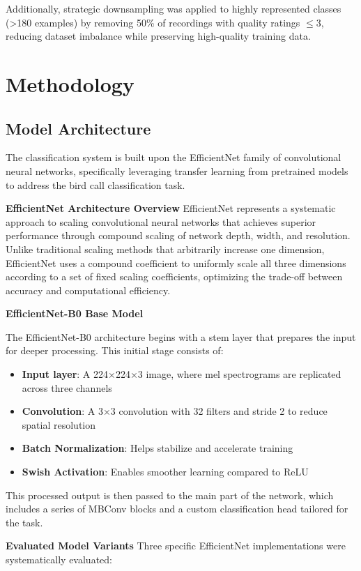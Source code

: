 \documentclass[ERTS, 2025]{ERTS}
\begin{document}
Additionally, strategic downsampling was applied to highly represented classes (>180 examples) by removing 50\% of recordings with quality ratings $\leq$3, reducing dataset imbalance while preserving high-quality training data.

\section{Methodology}
\subsection{Model Architecture}
The classification system is built upon the EfficientNet family of convolutional neural networks, specifically leveraging transfer learning from pretrained models to address the bird call classification task.

\textbf{EfficientNet Architecture Overview}
EfficientNet represents a systematic approach to scaling convolutional neural networks that achieves superior performance through compound scaling of network depth, width, and resolution. Unlike traditional scaling methods that arbitrarily increase one dimension, EfficientNet uses a compound coefficient to uniformly scale all three dimensions according to a set of fixed scaling coefficients, optimizing the trade-off between accuracy and computational efficiency.

\textbf{EfficientNet-B0 Base Model}

The EfficientNet-B0 architecture begins with a stem layer that prepares the input for deeper processing. This initial stage consists of:
\begin{itemize}
    \item \textbf{Input layer}: A 224×224×3 image, where mel spectrograms are replicated across three channels
    \item \textbf{Convolution}: A 3×3 convolution with 32 filters and stride 2 to reduce spatial resolution
    \item \textbf{Batch Normalization}: Helps stabilize and accelerate training
    \item \textbf{Swish Activation}: Enables smoother learning compared to ReLU
\end{itemize}

This processed output is then passed to the main part of the network, which includes a series of MBConv blocks and a custom classification head tailored for the task.

\textbf{Evaluated Model Variants}
Three specific EfficientNet implementations were systematically evaluated:
\end{document}
